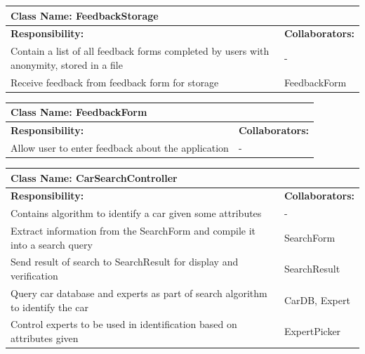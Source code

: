 \documentclass[12pt]{article}
\begin{document}
	\begin{table}[ht]
		\centering
		\begin{tabular}{|p{5cm}|p{5cm}|}
		\hline 
		 \multicolumn{2}{|l|}{\textbf{Class Name:} FeedbackStorage} \\
		\hline
		\textbf{Responsibility:} & \textbf{Collaborators:} \\
		\hline
		Contain a list of all feedback forms completed by users with anonymity, stored in a file & -\\
		\hline
	    Receive feedback from feedback form for storage & FeedbackForm\\
		\hline
		\end{tabular}
	\end{table}
	
	\begin{table}[ht]
		\centering
		\begin{tabular}{|p{5cm}|p{5cm}|}
		\hline 
		 \multicolumn{2}{|l|}{\textbf{Class Name:} FeedbackForm} \\
		\hline
		\textbf{Responsibility:} & \textbf{Collaborators:} \\
		\hline
	    Allow user to enter feedback about the application & -\\
		\hline
		\end{tabular}
	\end{table}
	
	\begin{table}[ht]
		\centering
		\begin{tabular}{|p{5cm}|p{5cm}|}
		\hline 
		 \multicolumn{2}{|l|}{\textbf{Class Name:} CarSearchController} \\
		\hline
		\textbf{Responsibility:} & \textbf{Collaborators:} \\
		\hline
		Contains algorithm to identify a car given some attributes & -\\
		\hline
	    Extract information from the SearchForm and compile it into a search query & SearchForm\\
	    \hline
	    Send result of search to SearchResult for display and verification & SearchResult\\
	    \hline
	    Query car database and experts as part of search algorithm to identify the car & CarDB, Expert\\
	    \hline
	    Control experts to be used in identification based on attributes given & ExpertPicker\\
		\hline
		\end{tabular}
	\end{table}
\end{document}

